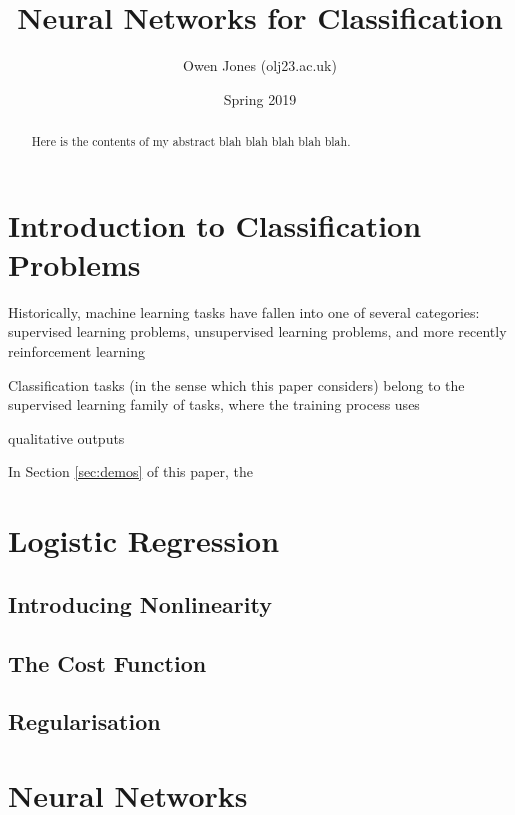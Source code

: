 \documentclass{article}
\begin{document}
	
	
	\title{Neural Networks for Classification}
	\author{Owen Jones (olj23\@bath.ac.uk)}
	\date{Spring 2019}
	\maketitle


\begin{abstract}
	Here is the contents of my abstract blah blah blah blah blah.
\end{abstract}



\section{Introduction to Classification Problems}

    Historically, machine learning tasks have fallen into one of several categories: supervised learning problems, unsupervised learning problems, and more recently reinforcement learning
    
    Classification tasks (in the sense which this paper considers) belong to the supervised learning family of tasks, where the training process uses
    
    qualitative outputs
    
    In Section \ref{sec:demos} of this paper, the 


\section{Logistic Regression}

    

    \subsection{Introducing Nonlinearity}

    \subsection{The Cost Function}

    \subsection{Regularisation}



\section{Neural Networks}
\end{document}
